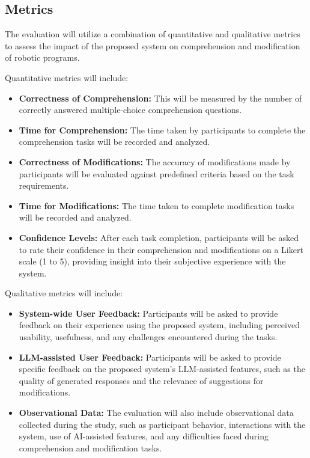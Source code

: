 \subsection{Metrics}
The evaluation will utilize a combination of quantitative and qualitative metrics to assess the impact of the proposed system on comprehension and modification of robotic programs.

Quantitative metrics will include:
\begin{itemize}
    \item \textbf{Correctness of Comprehension:} This will be measured by the number of correctly answered multiple-choice comprehension questions.
    \item \textbf{Time for Comprehension:} The time taken by participants to complete the comprehension tasks will be recorded and analyzed.
    \item \textbf{Correctness of Modifications:} The accuracy of modifications made by participants will be evaluated against predefined criteria based on the task requirements.
    \item \textbf{Time for Modifications:} The time taken to complete modification tasks will be recorded and analyzed.
    \item \textbf{Confidence Levels:} After each task completion, participants will be asked to rate their confidence in their comprehension and modifications on a Likert scale (1 to 5), providing insight into their subjective experience with the system.
\end{itemize}

Qualitative metrics will include:
\begin{itemize}
    \item \textbf{System-wide User Feedback:} Participants will be asked to provide feedback on their experience using the proposed system, including perceived usability, usefulness, and any challenges encountered during the tasks.
    \item \textbf{LLM-assisted User Feedback:} Participants will be asked to provide specific feedback on the proposed system's LLM-assisted features, such as the quality of generated responses and the relevance of suggestions for modifications.
    \item \textbf{Observational Data:} The evaluation will also include observational data collected during the study, such as participant behavior, interactions with the system, use of AI-assisted features, and any difficulties faced during comprehension and modification tasks.
\end{itemize}


